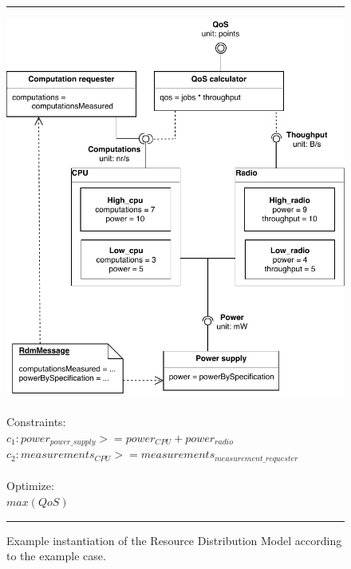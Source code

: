 \begin{figure}
\hrule
\begingroup\centering
  \includegraphics[width=\linewidth]{resources/img/rdm_cpu_radio.pdf}\endgroup \\ \\
  \noindent Constraints: \\
$c_1: power_{power\_supply} >= power_{CPU}+power_{radio} $ \\ 
$c_2: measurements_{CPU} >= measurements_{measurement\_requester}$ \\ \\
\noindent Optimize:\\$max(QoS)$\\
\hrule
\caption{Example instantiation of the Resource Distribution Model according to the example case.}
  \label{fig:rdm_cpu_radio}
\end{figure}

